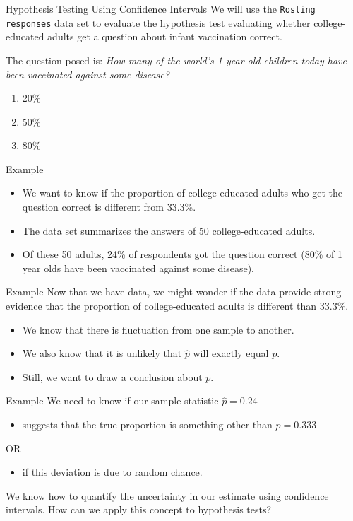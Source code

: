 \begin{frame}{Hypothesis Testing Using Confidence Intervals}
    We will use the \texttt{Rosling responses} data set to evaluate the hypothesis test evaluating whether college-educated adults get a question about infant vaccination correct. 
    
    \vspace{12pt}The question posed is: \textit{How many of the world's 1 year old children today have been vaccinated against some disease?}
    \begin{enumerate}
        \item 20\%
        \item 50\%
        \item 80\%
    \end{enumerate}
\end{frame}

\begin{frame}{Example}
    \begin{itemize}
        \item We want to know if the proportion of college-educated adults who get the question correct is different from 33.3\%.
        \item The data set summarizes the answers of 50 college-educated adults.
        \item Of these 50 adults, 24\% of respondents got the question correct (80\% of 1 year olds have been vaccinated against some disease).
    \end{itemize}
\end{frame}

\begin{frame}{Example}
    Now that we have data, we might wonder if the data provide strong evidence that the proportion of college-educated adults is different than 33.3\%.
    \begin{itemize}
        \item We know that there is fluctuation from one sample to another.
        \item We also know that it is unlikely that $\hat{p}$ will exactly equal $p$.
        \item Still, we want to draw a conclusion about $p$.
    \end{itemize}
\end{frame}

\begin{frame}{Example}
    We need to know if our sample statistic $\hat{p}=0.24$
    \begin{itemize}
        \item suggests that the true proportion is something other than $p=0.333$ 
    \end{itemize}
    OR
    \begin{itemize}
        \item if this deviation is due to random chance.
    \end{itemize}
    
    \vspace{12pt}We know how to quantify the uncertainty in our estimate using confidence intervals. How can we apply this concept to hypothesis tests?
\end{frame}

